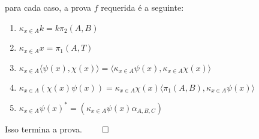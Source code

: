 \documentclass[../main.tex]{subfiles}
\begin{document}
para cada caso, a prova $f$ requerida é a seguinte:

\begin{enumerate}[label=(\roman*)]
    \item $\kappa_{x \in A} k = k \pi_2(A, B)$
    \item $\kappa_{x \in A} x = \pi_1(A, T)$
    \item $\kappa_{x \in A} \langle \psi(x), \chi(x) \rangle = \langle \kappa_{x \in A} \psi(x), \kappa_{x \in A} \chi(x) \rangle$
    \item $\kappa_{x \in A}(\chi(x)\psi(x)) = \kappa_{x \in A} \chi(x) \langle \pi_1(A, B), \kappa_{x \in A} \psi(x) \rangle$
    \item $\kappa_{x \in A}\psi(x)^{\ast} = (\kappa_{x \in A} \psi(x) \alpha_{A, B, C})$
\end{enumerate}

Isso termina a prova. $\qed$
\end{document}
